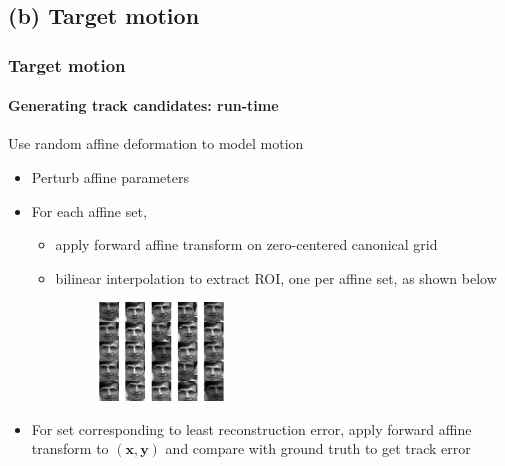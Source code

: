 \subsection{(b) Target motion}
\begin{frame}
\frametitle{Target motion}
\framesubtitle{Generating track candidates: run-time}
\mypagenum
Use random affine deformation to model motion
\begin{itemize}
\item Perturb affine parameters
\item For each affine set, 
\begin{itemize}
\item apply forward affine transform on zero-centered canonical grid 
\item bilinear interpolation to extract ROI, one per affine set, as shown below
\begin{figure}[t]
\centering
\includegraphics[width=0.35\textwidth]{thesis/affineCandidates.pdf}
\label{Fig:affine_candidates}
\end{figure}
\end{itemize}
\item For set corresponding to least reconstruction error, apply forward affine transform to $(\mathbf{x, y})$ and compare with ground truth to get track error
\end{itemize}
\end{frame}









